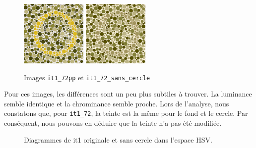 \documentclass[a4paper,11pt]{article}
\begin{document}
\begin{figure}[H]
  \begin{center}  
    \includegraphics[width=120px]{images/it1_72pp.png}
    \includegraphics[width=120px]{images/it1_72pp_sans_cercle.png}
    \caption{Images \texttt{it1\_72pp} et \texttt{it1\_72\_sans\_cercle}}
  \end{center}
\end{figure}

Pour ces images, les différences sont un peu plus subtiles à trouver. 
La luminance semble identique et la chrominance semble proche. Lors 
de l'analyse, nous constatons que, pour \texttt{it1\_72}, la teinte est 
la même pour le fond et le cercle. Par conséquent, nous pouvons en 
déduire que la teinte n'a pas été modifiée.

\begin{figure}[H]
  \begin{center}  
    \caption{Diagrammes de it1 originale et sans cercle dans 
    l’espace HSV.}
  \end{center}
\end{figure}
\end{document}
